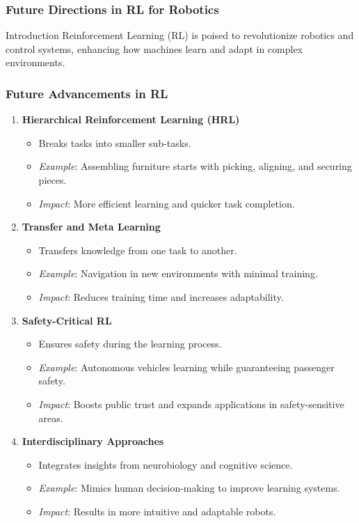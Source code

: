 \documentclass[aspectratio=169]{beamer}
\begin{document}
\begin{frame}
    \frametitle{Future Directions in RL for Robotics}
    \begin{block}{Introduction}
        Reinforcement Learning (RL) is poised to revolutionize robotics and control systems, enhancing how machines learn and adapt in complex environments.
    \end{block}
\end{frame}

\begin{frame}
    \frametitle{Future Advancements in RL}
    \begin{enumerate}
        \item \textbf{Hierarchical Reinforcement Learning (HRL)} 
        \begin{itemize}
            \item Breaks tasks into smaller sub-tasks.
            \item \textit{Example}: Assembling furniture starts with picking, aligning, and securing pieces.
            \item \textit{Impact}: More efficient learning and quicker task completion.
        \end{itemize}
        
        \item \textbf{Transfer and Meta Learning} 
        \begin{itemize}
            \item Transfers knowledge from one task to another.
            \item \textit{Example}: Navigation in new environments with minimal training.
            \item \textit{Impact}: Reduces training time and increases adaptability.
        \end{itemize}
        
        \item \textbf{Safety-Critical RL}
        \begin{itemize}
            \item Ensures safety during the learning process.
            \item \textit{Example}: Autonomous vehicles learning while guaranteeing passenger safety.
            \item \textit{Impact}: Boosts public trust and expands applications in safety-sensitive areas.
        \end{itemize}
        
        \item \textbf{Interdisciplinary Approaches}
        \begin{itemize}
            \item Integrates insights from neurobiology and cognitive science.
            \item \textit{Example}: Mimics human decision-making to improve learning systems.
            \item \textit{Impact}: Results in more intuitive and adaptable robots.
        \end{itemize}
    \end{enumerate}
\end{frame}
\end{document}
